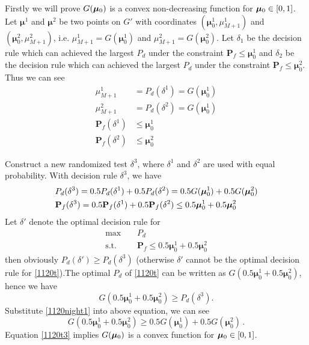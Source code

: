 Firstly we will prove $G(\boldsymbol{\mu}_0)$ is a convex non-decreasing function for $\boldsymbol{\mu}_0 \in [0, 1]$.
 Let $\boldsymbol{\mu}^1$ and  $\boldsymbol{\mu}^2$ be two points on $G'$ with coordinates $(\boldsymbol{\mu}^1_0, \mu_{M+1}^1)$ and $(\boldsymbol{\mu}^2_0, \mu_{M+1}^2)$, i.e. $\mu_{M+1}^1 = G(\boldsymbol{\mu}_0^1)$ and $\mu_{M+1}^2 = G(\boldsymbol{\mu}_0^2)$. Let $\delta_1$ be the decision rule which can achieved the largest $P_d$ under the constraint $\mathbf{P}_f \leq \boldsymbol{\mu}_0^1$ and $\delta_2$ be the decision rule which can achieved the largest $P_d$ under the constraint $\mathbf{P}_{f} \leq \boldsymbol{\mu}_0^2$. Thus we can see 
 \begin{subequations}
\begin{align}
\mu_{M+1}^1 &= P_d(\delta^1) = G(\boldsymbol{\mu}_0^1)\\
\mu_{M+1}^2 &= P_d(\delta^2)=G(\boldsymbol{\mu}_0^1)\\
\mathbf{P}_f(\delta^1) &\leq \boldsymbol{\mu}^1_0\\
\mathbf{P}_f(\delta^2) &\leq \boldsymbol{\mu}^2_0
\end{align}
 \end{subequations}
 
Construct a new randomized test $\delta^3$, where $\delta^1$ and $\delta^2$ are used with equal probability. With decision rule $\delta^3$, we have 
\begin{subequations}
\begin{align}
\label{1120night1}
&P_d(\delta^3) = 0.5P_d(\delta^1)+0.5P_d(\delta^2) = 0.5G(\boldsymbol{\mu}_0^1) + 0.5G(\boldsymbol{\mu}_0^2)\\
&\mathbf{P}_{f}(\delta^3) = 0.5\mathbf{P}_f(\delta^1)+0.5\mathbf{P}_f(\delta^2) \leq 0.5\boldsymbol{\mu}^1_0 + 0.5\boldsymbol{\mu}^2_0
\end{align}
\end{subequations}
Let $\delta'$ denote the optimal decision rule for 
 \begin{equation}
 \begin{split}
 \label{1120t}
 \max&\;\;\;\;P_d\\
 \text{s.t.}&\;\;\;\;\mathbf{P}_f \leq 0.5\boldsymbol{\mu}^1_0 + 0.5\boldsymbol{\mu}^2_0
 \end{split}
 \end{equation}
then obviously $P_d(\delta') \geq P_d(\delta^3)$ (otherwise $\delta'$ cannot be the optimal decision rule for \eqref{1120t}).The optimal $P_d$ of \eqref{1120t} can be written as $G(0.5\boldsymbol{\mu}^1_0 + 0.5\boldsymbol{\mu}^2_0)$, hence we have  
\begin{equation}
\label{1120t2}
G(0.5\boldsymbol{\mu}^1_0 + 0.5\boldsymbol{\mu}^2_0) \geq  P_d(\delta^3).
\end{equation}
Substitute \eqref{1120night1} into above equation, we can see
\begin{equation}
\label{1120t3}
G(0.5\boldsymbol{\mu}^1_0 + 0.5\boldsymbol{\mu}^2_0) \geq 0.5 G(\boldsymbol{\mu}^1_0)+ 0.5 G(\boldsymbol{\mu}^2_0)\,.
\end{equation}
Equation \eqref{1120t3} implies $G(\boldsymbol{\mu}_0)$ is a convex function for $\boldsymbol{\mu}_0 \in [0, 1]$.


